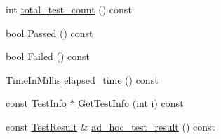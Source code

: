 \begin{DoxyCompactItemize}
int \hyperlink{classtesting_1_1TestSuite_a38a5e95341cfee5a88d8910f69da4960}{total\+\_\+test\+\_\+count} () const
\item 
bool \hyperlink{classtesting_1_1TestSuite_add51ece89b069b29e07f0476e0e6aae9}{Passed} () const
\item 
bool \hyperlink{classtesting_1_1TestSuite_adec55446c23dc2d0bfea91c6125a1047}{Failed} () const
\item 
\hyperlink{namespacetesting_a992de1d091ce660f451d1e8b3ce30fd6}{Time\+In\+Millis} \hyperlink{classtesting_1_1TestSuite_a2ede69fa37985ab8b21128955c56d6d7}{elapsed\+\_\+time} () const
\item 
const \hyperlink{classtesting_1_1TestInfo}{Test\+Info} $\ast$ \hyperlink{classtesting_1_1TestSuite_aa6e617d79e4272362735ca9be4fb40d7}{Get\+Test\+Info} (int i) const
\item 
const \hyperlink{classtesting_1_1TestResult}{Test\+Result} \& \hyperlink{classtesting_1_1TestSuite_a3391a0ec111c66e1ac16a800f5068af7}{ad\+\_\+hoc\+\_\+test\+\_\+result} () const
\end{DoxyCompactItemize}
